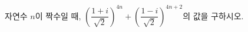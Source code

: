 자연수 $n$이 짝수일 때, $\left(\dfrac{1+i}{\sqrt{2}}\right)^{4n}+\left(\dfrac{1-i}{\sqrt{2}}\right)^{4n+2}$의 값을 구하시오.
